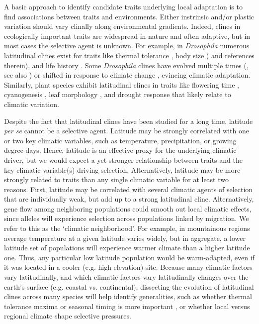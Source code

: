 \documentclass[11pt, oneside]{article}
\begin{document}
A basic approach to identify candidate traits underlying local adaptation is to find associations between traits and environments. Either instrinsic and/or plastic variation should vary clinally along environmental gradients. Indeed, clines in ecologically important traits are widespread in nature \citep{Endler_1977} and often adaptive, but in most cases the selective agent is unknown. For example, in \textit{Drosophila} numerous latitudinal clines exist for traits like thermal tolerance \citep{Hoffmann_etal_2002}, body size (\cite{Coyne_Beecham_1987} and references therein), and life history \citep{Schmidt_etal_2005}. Some \textit{Drosophila} clines have evolved multiple times (\cite{Oakeshott_etal_1982, Huey_etal_2000}, see also \cite{Bradshaw_Holzapfel_2001}) or shifted in response to climate change \citep{Umina_etal_2005}, evincing climatic adaptation. Similarly, plant species exhibit latitudinal clines in traits like flowering time \citep{Stinchcombe_etal_2004}, cyanogenesis \citep{Kooyers_Olsen_2012}, leaf morphology \citep{Hopkins_etal_2008}, and drought response \citep{Kooyers_etal_2015} that likely relate to climatic variation. 

Despite the fact that latitudinal clines have been studied for a long time, latitude \textit{per se} cannot be a selective agent. Latitude may be strongly correlated with one or two key climatic variables, such as temperature, precipitation, or growing degree-days. Hence, latitude is an effective proxy for the underlying climatic driver, but we would expect a yet stronger relationship between traits and the key climatic variable(s) driving selection. Alternatively, latitude may be more strongly related to traits than any single climatic variable for at least two reasons. First, latitude may be correlated with several climatic agents of selection that are individually weak, but add up to a strong latitudinal cline. Alternatively, gene flow among neighboring populations could smooth out local climatic effects, since alleles will experience selection across populations linked by migration. We refer to this as the `climatic neighborhood'. For example, in mountainous regions average temperature at a given latitude varies widely, but in aggregate, a lower latitude set of populations will experience warmer climate than a higher latitude one. Thus, any particular low latitude population would be warm-adapted, even if it was located in a cooler (e.g. high elevation) site. Because many climatic factors vary latitudinally, and which climatic factors vary latitudinally changes over the earth's surface (e.g. coastal vs. continental), dissecting the evolution of latitudinal clines across many species will help identify generalities, such as whether thermal tolerance maxima or seasonal timing is more important \citep{Bradshaw_Holzapfel_2008}, or whether local versus regional climate shape selective pressures.
\end{document}
